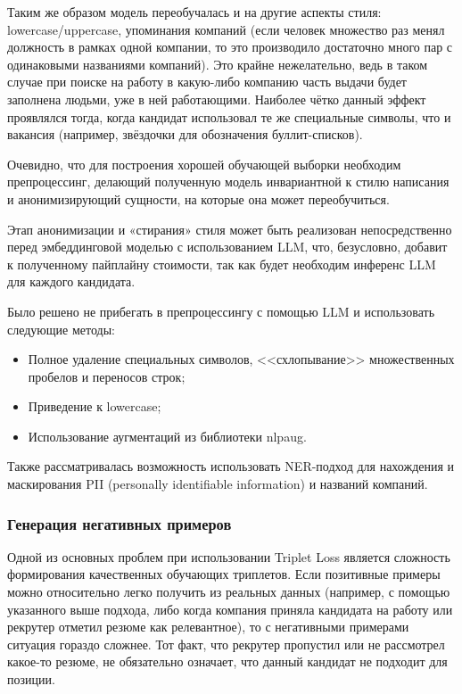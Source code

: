 \documentclass[14pt]{mmcs_article}
\begin{document}
Таким же образом модель переобучалась и на другие аспекты стиля: lowercase/uppercase, упоминания компаний (если человек множество раз менял должность в рамках одной компании, то это производило достаточно много пар с одинаковыми названиями компаний). Это крайне нежелательно, ведь в таком случае при поиске на работу в какую-либо компанию часть выдачи будет заполнена людьми, уже в ней работающими. Наиболее чётко данный эффект проявлялся тогда, когда кандидат использовал те же специальные символы, что и вакансия (например, звёздочки для обозначения буллит-списков).

Очевидно, что для построения хорошей обучающей выборки необходим препроцессинг, делающий полученную модель инвариантной к стилю написания и анонимизирующий сущности, на которые она может переобучиться.

Этап анонимизации и «стирания» стиля может быть реализован непосредственно перед эмбеддинговой моделью с использованием LLM, что, безусловно, добавит к полученному пайплайну стоимости, так как будет необходим инференс LLM для каждого кандидата.

Было решено не прибегать в препроцессингу с помощью LLM и использовать следующие методы:

\begin{itemize}
  \item Полное удаление специальных символов, <<схлопывание>> множественных пробелов и переносов строк;
  \item Приведение к lowercase;
  \item Использование аугментаций из библиотеки nlpaug.
\end{itemize}

Также рассматривалась возможность использовать NER-подход для нахождения и маскирования PII (personally identifiable information) и названий компаний.

\subsubsection{Генерация негативных примеров}

Одной из основных проблем при использовании Triplet Loss является сложность формирования качественных обучающих триплетов. Если позитивные примеры можно относительно легко получить из реальных данных (например, с помощью указанного выше подхода, либо когда компания приняла кандидата на работу или рекрутер отметил резюме как релевантное), то с негативными примерами ситуация гораздо сложнее. Тот факт, что рекрутер пропустил или не рассмотрел какое-то резюме, не обязательно означает, что данный кандидат не подходит для позиции.
\end{document}
